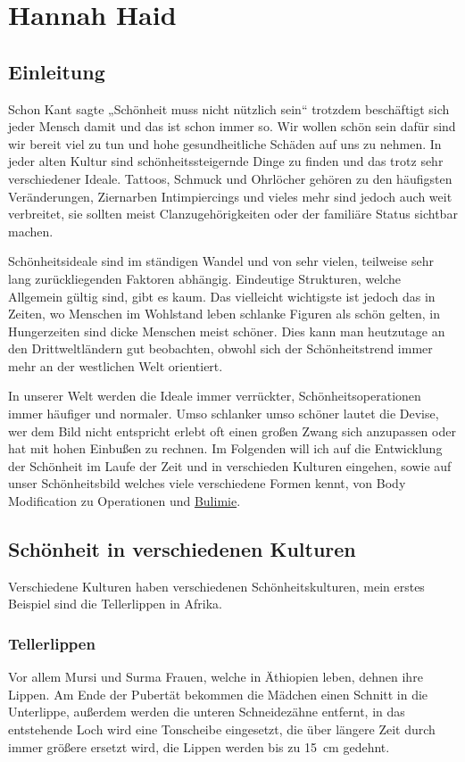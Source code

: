 \chapter{Hannah Haid}
\label{sec:Hannah_Haid}

\section{Einleitung}
Schon Kant sagte „Schönheit muss nicht nützlich sein“ trotzdem beschäftigt sich jeder Mensch damit
und das ist schon immer so. Wir wollen schön sein dafür sind wir bereit viel zu tun und hohe
gesundheitliche Schäden auf uns zu nehmen. In jeder alten Kultur sind schönheitssteigernde Dinge zu
finden und das trotz sehr verschiedener Ideale. Tattoos, Schmuck und Ohrlöcher gehören zu den
häufigsten Veränderungen, Ziernarben Intimpiercings und vieles mehr sind jedoch auch weit verbreitet,
sie sollten meist Clanzugehörigkeiten  oder der familiäre Status
sichtbar machen.

Schönheitsideale sind im ständigen Wandel und von sehr vielen, teilweise sehr lang zurückliegenden
Faktoren abhängig. Eindeutige Strukturen, welche Allgemein gültig sind, gibt es kaum. Das vielleicht
wichtigste ist jedoch das in Zeiten, wo Menschen im Wohlstand leben schlanke Figuren als schön
gelten, in Hungerzeiten sind dicke Menschen meist schöner. Dies kann man heutzutage an den
Drittweltländern gut beobachten, obwohl sich der Schönheitstrend immer mehr an der westlichen Welt
orientiert.

In unserer Welt werden die Ideale immer verrückter, Schönheitsoperationen immer häufiger und
normaler. Umso schlanker umso schöner lautet die Devise, wer dem Bild nicht entspricht erlebt oft
einen großen Zwang sich anzupassen oder hat mit hohen Einbußen zu rechnen.
Im Folgenden will ich auf die Entwicklung der Schönheit im Laufe der Zeit und in verschieden Kulturen
eingehen, sowie auf unser Schönheitsbild welches viele verschiedene Formen kennt, von Body
Modification zu Operationen und \href{http://de.wikipedia.org/wiki/Bulimie}{Bulimie}.

\clearpage
\section{Schönheit in verschiedenen Kulturen}
Verschiedene Kulturen haben verschiedenen Schönheitskulturen, mein erstes Beispiel sind die
Tellerlippen in Afrika.

\subsection{Tellerlippen}
Vor allem Mursi und Surma Frauen, welche in Äthiopien leben, dehnen ihre Lippen. Am Ende der Pubertät
bekommen die Mädchen einen Schnitt in die Unterlippe, außerdem werden die unteren Schneidezähne
entfernt, in das entstehende Loch wird eine Tonscheibe eingesetzt, die über längere Zeit durch immer
größere ersetzt wird, die Lippen werden bis zu \SI{15}{\centi\metre} gedehnt.


